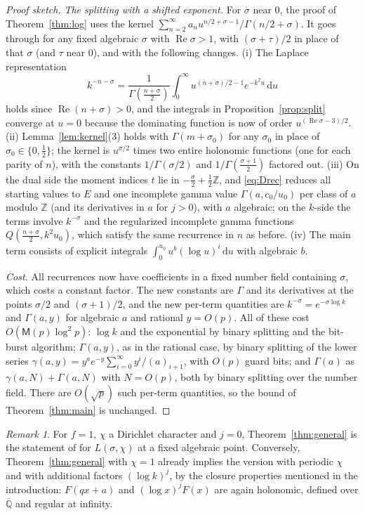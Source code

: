 \documentclass[11pt]{amsart}
\theoremstyle{definition}
\theoremstyle{remark}
\newtheorem{remark}[theorem]{Remark}
\newcommand{\dd}{\,\mathrm{d}}
\newcommand{\Qbar}{\overline{\mathbb{Q}}}
\newcommand{\ZZ}{\mathbb{Z}}
\newcommand{\Mul}{\mathsf{M}}
\begin{document}
\begin{proof}[Proof sketch]
\emph{The splitting with a shifted exponent.} For $\sigma$ near $0$, the proof of Theorem~\ref{thm:log} uses
the kernel $\sum_{n=2}^{\infty}a_nu^{n/2+\sigma-1}/\Gamma(n/2+\sigma)$. It goes through for any fixed algebraic $\sigma$
with $\operatorname{Re}\sigma > 1$, with $(\sigma+\tau)/2$ in place of that $\sigma$ (and $\tau$ near $0$), and with the
following changes. (i) The Laplace representation
\[
  k^{-n-\sigma} = \frac{1}{\Gamma(\frac{n+\sigma}2)}\int_0^\infty u^{(n+\sigma)/2-1}e^{-k^2u}\dd u
\]
holds since $\operatorname{Re}(n + \sigma) > 0$, and the integrals in Proposition~\ref{prop:split} converge at $u = 0$
because the dominating function is now of order $u^{(\operatorname{Re}\sigma-3)/2}$. (ii) Lemma~\ref{lem:kernel}(3) holds with
$\Gamma(m+\sigma_0)$ for any $\sigma_0$ in place of $\sigma_0 \in \{0, \frac12\}$; the kernel is $u^{\sigma/2}$ times
two entire holonomic functions (one for each parity of $n$), with the constants $1/\Gamma(\sigma/2)$ and
$1/\Gamma(\frac{\sigma+1}2)$ factored out. (iii) On the dual side the moment indices $t$ lie in $-\frac\sigma2 + \frac12\ZZ$, and
\eqref{eq:Drec} reduces all starting values to $E$ and one incomplete gamma value $\Gamma(a, c_0/u_0)$ per class
of $a$ modulo $\ZZ$ (and its derivatives in $a$ for $j > 0$), with $a$ algebraic; on the $k$-side the terms involve
$k^{-\sigma}$ and the regularized incomplete gamma functions $Q(\frac{n+\sigma}{2}, k^2u_0)$, which satisfy the same
recurrence in $n$ as before. (iv) The main term consists of explicit integrals $\int_0^{u_0}u^{b}(\log u)^i\dd u$ with
algebraic $b$.

\emph{Cost.} All recurrences now have coefficients in a fixed number field containing $\sigma$, which costs a
constant factor. The new constants are $\Gamma$ and its derivatives at the points $\sigma/2$ and $(\sigma+1)/2$,
and the new per-term quantities are $k^{-\sigma} = e^{-\sigma\log k}$ and $\Gamma(a, y)$ for algebraic $a$ and
rational $y = O(p)$. All of these cost $O(\Mul(p)\log^2p)$: $\log k$ and the exponential by binary splitting and the
bit-burst algorithm; $\Gamma(a, y)$, as in the rational case, by binary splitting of the lower series
$\gamma(a, y) = y^ae^{-y}\sum_{i=0}^{\infty}y^i/(a)_{i+1}$, with $O(p)$ guard bits; and $\Gamma(a)$ as
$\gamma(a, N) + \Gamma(a, N)$ with $N = O(p)$, both by binary splitting over the number field. There are
$O(\sqrt p)$ such per-term quantities, so the bound of Theorem~\ref{thm:main} is unchanged.
\end{proof}

\begin{remark}
For $f = 1$, $\chi$ a Dirichlet character and $j = 0$, Theorem~\ref{thm:general} is the statement of \cite{Joh21} for
$L(\sigma, \chi)$ at a fixed algebraic point. Conversely, Theorem~\ref{thm:general} with $\chi = 1$ already implies the
version with periodic $\chi$ and with additional factors $(\log k)^j$, by the closure properties mentioned in the
introduction: $F(qx+a)$ and $(\log x)^jF(x)$ are again holonomic, defined over $\Qbar$ and regular at infinity.
\end{remark}
\end{document}
